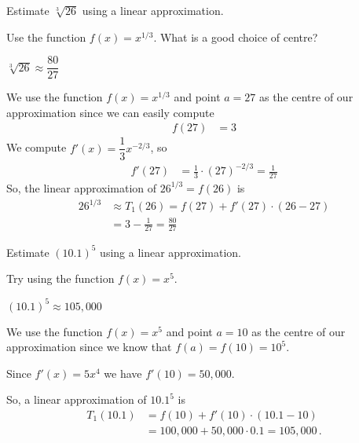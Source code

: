 \begin{question}[2015Q]
Estimate $\sqrt[3]{26}$ using a linear approximation.
\end{question}
\begin{hint} Use the function $f(x)=x^{1/3}$. What is a good choice of centre?
\end{hint}
\begin{answer}
  $ \sqrt[3]{26}\approx \dfrac{80}{27}$
\end{answer}
\begin{solution}
We use the function $f(x)=x^{1/3}$ and point $a=27$ as the centre of our
approximation since we can easily compute
\begin{align*}
    f(27)&=3
\end{align*}
We compute $f'(x)=\dfrac{1}{3} x^{-2/3}$, so
\begin{align*}
    f'(27)&= \frac{1}{3} \cdot (27)^{-2/3} = \frac{1}{27}
\end{align*}
So, the linear approximation of $26^{1/3} = f(26)$ is
\begin{align*}
    26^{1/3}&\approx T_1\left(26\right) = f(27) + f'(27)\cdot (26-27) \\
  &= 3 - \frac{1}{27} = \frac{80}{27}
\end{align*}
\end{solution}




\begin{question}[2015Q]
Estimate $(10.1)^5$ using a linear approximation.
\end{question}
\begin{hint} Try using the function $f(x)=x^5$.
\end{hint}
\begin{answer}
$(10.1)^5 \approx 105,000$
\end{answer}
\begin{solution}
We use the function $f(x)=x^5$ and point $a=10$ as the centre of our
approximation since we know that $f(a)=f(10)=10^5$.

Since $f'(x) = 5x^4$ we have $f'(10) = 50,000$.

So, a linear approximation of $10.1^5$ is
\begin{align*}
T_1(10.1)&= f(10) + f'(10)\cdot (10.1-10) \\
 &= 100,000 + 50,000 \cdot 0.1 = 105,000\,.
\end{align*}
\end{solution}




